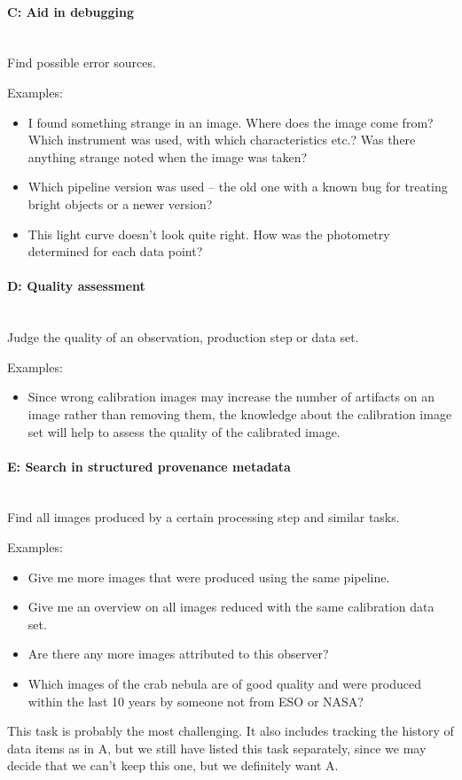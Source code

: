 \documentclass[11pt,a4paper]{ivoa}
\newcommand{\paragraphlb}[1]{\paragraph{#1}\mbox{}\\} %
\begin{document}
\paragraphlb{C: Aid in debugging}
		Find possible error sources.

		\noindent Examples:
		\begin{itemize}
			\item I found something strange in an image. Where does
the image come from? Which instrument was used, with which characteristics
etc.? Was there anything strange noted when the image was taken?  
			\item Which pipeline version was used -- the old one
with a known bug for treating bright objects or a newer version?  
			\item This light curve doesn't look quite right. How was
the photometry determined for each data point?  
		\end{itemize}

	  

\paragraphlb{D: Quality assessment}
		Judge the quality of an observation, production step or data set.
		
		\noindent Examples:
		\begin{itemize}
			\item Since wrong calibration images may increase the
number of artifacts on an image rather than removing them, the knowledge about
the calibration image set will help to assess the quality of the calibrated
image.  
		\end{itemize}
	  

\paragraphlb{E: Search in structured provenance metadata}
		Find all images produced by a certain processing step and similar tasks.
		
		\noindent Examples:
		\begin{itemize}
			\item Give me more images that were produced using the
same pipeline.  
			\item Give me an overview on all images reduced with the same calibration data set.  
			\item Are there any more images attributed to this observer?  
			\item Which images of the crab nebula are of good quality and were produced within the last 10 years by someone not from ESO or NASA?  
		\end{itemize}

		This task is probably the most challenging. It also includes tracking the history of data items as in A, but we still have listed this task separately, since we may decide that we can't keep this one, but we definitely want A.
	  
\end{document}
